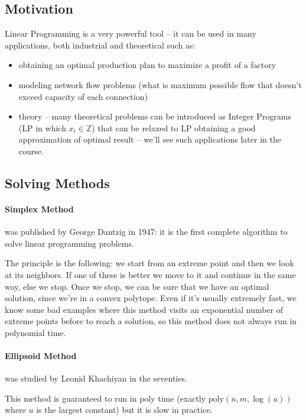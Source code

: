 \subsection*{Motivation}

Linear Programming is a very powerful tool -- it can be used in many applications, both
industrial and theoretical such as:
\begin{itemize}
  \item obtaining an optimal production plan to maximize a profit of a factory
  \item modeling network flow problems (what is maximum possible flow that doesn't exceed
    capacity of each connection)
  \item theory -- many theoretical problems can be introduced as Integer Programs (LP in which
    $x_i\in\mathbb{Z}$) that can be relaxed to LP obtaining a good approximation of optimal
    result -- we'll see such applications later in the course.
\end{itemize}

\subsection*{Solving Methods}

\paragraph{Simplex Method} was published by George Dantzig in 1947: it is the first complete
algorithm to solve linear programming problems.

The principle is the following: we start from an extreme point and then we look at its neighbors.
If one of these is better we move to it and continue in the same way, else we stop. Once we stop,
we can be sure that we have an optimal solution, since we're in a convex polytope. Even if it's
usually extremely fast, we know some bad examples where this method visits an exponential number
of extreme points before to reach a solution, so this method does not always run in polynomial
time.

\paragraph{Ellipsoid Method} was studied by Leonid Khachiyan in the seventies.

This method is guaranteed to run in poly time (exactly $\mathrm{poly}(n,m,\log(u))$ where $u$ is
the largest constant) but it is slow in practice.

